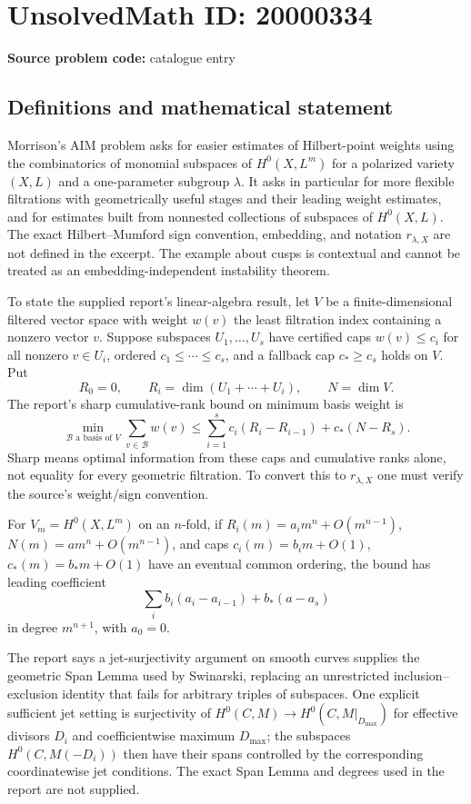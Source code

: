 \documentclass[11pt]{article}
\begin{document}
\section*{UnsolvedMath ID: 20000334}
\textbf{Source problem code:} catalogue entry
\subsection{Definitions and mathematical statement}
Morrison's AIM problem asks for easier estimates of Hilbert-point weights using the combinatorics of monomial subspaces of $H^0(X,L^m)$ for a polarized variety $(X,L)$ and a one-parameter subgroup $\lambda$. It asks in particular for more flexible filtrations with geometrically useful stages and their leading weight estimates, and for estimates built from nonnested collections of subspaces of $H^0(X,L)$. The exact Hilbert--Mumford sign convention, embedding, and notation $r_{\lambda,X}$ are not defined in the excerpt. The example about cusps is contextual and cannot be treated as an embedding-independent instability theorem.

To state the supplied report's linear-algebra result, let $V$ be a finite-dimensional filtered vector space with weight $w(v)$ the least filtration index containing a nonzero vector $v$. Suppose subspaces $U_1,\ldots,U_s$ have certified caps $w(v)\leq c_i$ for all nonzero $v\in U_i$, ordered $c_1\leq\cdots\leq c_s$, and a fallback cap $c_*\geq c_s$ holds on $V$. Put
\[
 R_0=0,\qquad R_i=\dim(U_1+\cdots+U_i),\qquad N=\dim V.
\]
The report's sharp cumulative-rank bound on minimum basis weight is
\[
 \min_{\mathcal B\text{ a basis of }V}\sum_{v\in\mathcal B}w(v)
 \leq\sum_{i=1}^s c_i(R_i-R_{i-1})+c_*(N-R_s).
\]
Sharp means optimal information from these caps and cumulative ranks alone, not equality for every geometric filtration. To convert this to $r_{\lambda,X}$ one must verify the source's weight/sign convention.

For $V_m=H^0(X,L^m)$ on an $n$-fold, if $R_i(m)=a_i m^n+O(m^{n-1})$, $N(m)=a m^n+O(m^{n-1})$, and caps $c_i(m)=b_i m+O(1)$, $c_*(m)=b_*m+O(1)$ have an eventual common ordering, the bound has leading coefficient
\[
 \sum_i b_i(a_i-a_{i-1})+b_*(a-a_s)
\]
in degree $m^{n+1}$, with $a_0=0$.

The report says a jet-surjectivity argument on smooth curves supplies the geometric Span Lemma used by Swinarski, replacing an unrestricted inclusion--exclusion identity that fails for arbitrary triples of subspaces. One explicit sufficient jet setting is surjectivity of $H^0(C,M)\to H^0(C,M|_{D_{\max}})$ for effective divisors $D_i$ and coefficientwise maximum $D_{\max}$; the subspaces $H^0(C,M(-D_i))$ then have their spans controlled by the corresponding coordinatewise jet conditions. The exact Span Lemma and degrees used in the report are not supplied.
\end{document}
